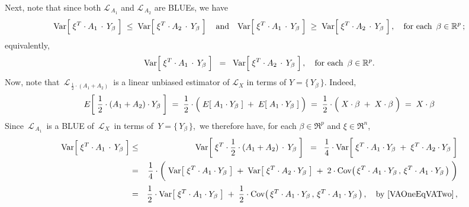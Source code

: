 \noindent
Next, note that since both $\mathcal{L}_{\,A_{1}}$ and $\mathcal{L}_{\,A_{2}}$ are BLUEs, we have
\begin{equation*}
	\Var\!\left[\;\xi^{T} \cdot A_{1} \overset{{\color{white}-}}{\cdot} Y_{\beta}\;\right]
	\;\leq\;
	\Var\!\left[\;\xi^{T} \cdot A_{2} \overset{{\color{white}-}}{\cdot} Y_{\beta}\;\right]
\quad\textnormal{and}\quad
	\Var\!\left[\;\xi^{T} \cdot A_{1} \overset{{\color{white}-}}{\cdot} Y_{\beta}\;\right]
	\;\geq\;
	\Var\!\left[\;\xi^{T} \cdot A_{2} \overset{{\color{white}-}}{\cdot} Y_{\beta}\;\right],
\quad\textnormal{for each \,$\beta\in\Re^{p}$}\,;
\end{equation*}
equivalently,
\begin{equation}\label{VAOneEqVATwo}
\Var\!\left[\;\xi^{T} \cdot A_{1} \overset{{\color{white}-}}{\cdot} Y_{\beta}\;\right]
\;\;=\;\;
\Var\!\left[\;\xi^{T} \cdot A_{2} \overset{{\color{white}-}}{\cdot} Y_{\beta}\;\right],
\quad\textnormal{for each \,$\beta\in\Re^{p}$}.
\end{equation}
Now, note that \,$\mathcal{L}_{\,\frac{1}{2}\cdot(A_{1}+A_{2})}$\, is a linear unbiased estimator
of $\mathcal{L}_{X}$ in terms of $Y = \{\,Y_{\beta}\,\}$.
Indeed,
\begin{equation*}
E\!\left[\; \frac{1}{2}\cdot(A_{1} + A_{2})\cdot Y_{\beta}\;\right]
\;=\; \dfrac{1}{2} \cdot \left(\;E\!\left[\;A_{1} \cdot Y_{\beta}\;\right] \;\overset{{\color{white}.}}{+}\; E\!\left[\;A_{1} \cdot Y_{\beta}\;\right]\;\right)
\;=\; \dfrac{1}{2} \cdot \left(\;X\cdot\beta \;\overset{{\color{white}.}}{+}\; X\cdot\beta\;\right)
\;=\; X\cdot\beta
\end{equation*}
Since \,$\mathcal{L}_{\,A_{1}}$\, is a BLUE of \,$\mathcal{L}_{X}$\, in terms of \,$Y = \{\,Y_{\beta}\,\}$,\,
we therefore have, for each $\beta \in \Re^{p}$ and $\xi \in \Re^{n}$,
\begin{eqnarray*}
\Var\!\left[\;\xi^{T} \cdot A_{1} \overset{{\color{white}-}}{\cdot} Y_{\beta}\;\right]
& \leq &
	\Var\!\left[\;\xi^{T} \cdot \dfrac{1}{2} \cdot (A_{1}+A_{2}) \overset{{\color{white}-}}{\cdot} Y_{\beta}\;\right]
\;\; = \;\;
	\dfrac{1}{4}
	\cdot
	\Var\!\left[\;
		\xi^{T} \cdot A_{1} \cdot Y_{\beta}
		\;\overset{{\color{white}\vert}}{+}\;
		\xi^{T} \cdot A_{2} \cdot Y_{\beta}
		\;\right]
\\
& = &
	\dfrac{1}{4}
	\cdot
	\left(\;
		\Var\!\left[\; \xi^{T} \cdot A_{1} \cdot Y_{\beta} \;\right]
		\;\overset{{\color{white}\vert}}{+}\;
		\Var\!\left[\; \xi^{T} \cdot A_{2} \cdot Y_{\beta} \;\right]
		\;\overset{{\color{white}\vert}}{+}\;
		2\cdot\Cov\!\left(\,\xi^{T} \cdot A_{1} \cdot Y_{\beta}\,,\,\xi^{T} \cdot A_{1} \cdot Y_{\beta}\,\right)
	\;\right)
\\
& = &
	\dfrac{1}{2} \cdot \Var\!\left[\; \xi^{T} \cdot A_{1} \cdot Y_{\beta} \;\right]
	\;\overset{{\color{white}\vert}}{+}\;
	\dfrac{1}{2}\cdot\Cov\!\left(\,\xi^{T} \cdot A_{1} \cdot Y_{\beta}\,,\,\xi^{T} \cdot A_{1} \cdot Y_{\beta}\,\right),
	\quad
	\textnormal{by \eqref{VAOneEqVATwo}}\,,
\end{eqnarray*}

